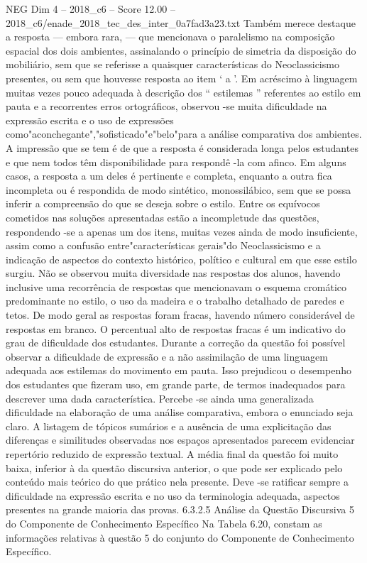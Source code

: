 \begin{textsample}{NEG Dim 4 – 2018\_c6 – Score 12.00 – 2018\_c6/enade\_2018\_tec\_des\_inter\_0a7fad3a23.txt}
Também merece destaque a resposta — embora rara, — que mencionava o paralelismo na composição espacial dos dois ambientes, assinalando o princípio de simetria da disposição do mobiliário, sem que se referisse a quaisquer características do Neoclassicismo presentes, ou sem que houvesse resposta ao item ‘ a ’.
Em acréscimo à linguagem muitas vezes pouco adequada à descrição dos “ estilemas ” referentes ao estilo em pauta e a recorrentes erros ortográficos, observou -se muita dificuldade na expressão escrita e o uso de expressões como"aconchegante","sofisticado"e"belo"para a análise comparativa dos ambientes.
A impressão que se tem é de que a resposta é considerada longa pelos estudantes e que nem todos têm disponibilidade para respondê -la com afinco.
Em alguns casos, a resposta a um deles é pertinente e completa, enquanto a outra fica incompleta ou é respondida de modo sintético, monossilábico, sem que se possa inferir a compreensão do que se deseja sobre o estilo.
Entre os equívocos cometidos nas soluções apresentadas estão a incompletude das questões, respondendo -se a apenas um dos itens, muitas vezes ainda de modo insuficiente, assim como a confusão entre"características gerais"do Neoclassicismo e a indicação de aspectos do contexto histórico, político e cultural em que esse estilo surgiu.
Não se observou muita diversidade nas respostas dos alunos, havendo inclusive uma recorrência de respostas que mencionavam o esquema cromático predominante no estilo, o uso da madeira e o trabalho detalhado de paredes e tetos.
De modo geral as respostas foram fracas, havendo número considerável de respostas em branco.
O percentual alto de respostas fracas é um indicativo do grau de dificuldade dos estudantes.
Durante a correção da questão foi possível observar a dificuldade de expressão e a não assimilação de uma linguagem adequada aos estilemas do movimento em pauta.
Isso prejudicou o desempenho dos estudantes que fizeram uso, em grande parte, de termos inadequados para descrever uma dada característica.
Percebe -se ainda uma generalizada dificuldade na elaboração de uma análise comparativa, embora o enunciado seja claro.
A listagem de tópicos sumários e a ausência de uma explicitação das diferenças e similitudes observadas nos espaços apresentados parecem evidenciar repertório reduzido de expressão textual.
A média final da questão foi muito baixa, inferior à da questão discursiva anterior, o que pode ser explicado pelo conteúdo mais teórico do que prático nela presente.
Deve -se ratificar sempre a dificuldade na expressão escrita e no uso da terminologia adequada, aspectos presentes na grande maioria das provas. 6.3.2.5 Análise da Questão Discursiva 5 do Componente de Conhecimento Específico Na Tabela 6.20, constam as informações relativas à questão 5 do conjunto do Componente de Conhecimento Específico.

\end{textsample}
